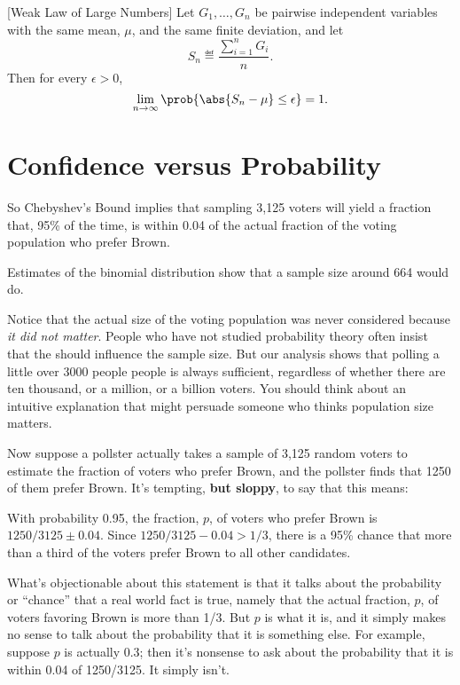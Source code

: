 \begin{corollary}\label{weaklaw}[Weak Law of Large Numbers]
  Let $G_1, \dots, G_n$ be pairwise independent variables with the same
  mean, $\mu$, and the same finite deviation, and let
\[
S_n \eqdef \frac{\sum_{i=1}^n G_i}{n}.
\]
Then for every $\epsilon > 0$,
\[
\lim_{n \rightarrow \infty}
        \prob{\abs{S_n - \mu}  \leq \epsilon} = 1.
\]
\end{corollary}

\section{Confidence versus Probability}\label{sec: Confidence_v_Prob}

So Chebyshev's Bound implies that sampling 3,125 voters will yield a
fraction that, 95\% of the time, is within 0.04 of the actual fraction
of the voting population who prefer Brown.  \begin{editingnotes}
  Estimates of the binomial distribution show that a sample size
  around 664 would do.
\end{editingnotes}

Notice that the actual size of the voting population was never
considered because \emph{it did not matter}.  People who have not
studied probability theory often insist that the 
should influence the sample size.  But our analysis shows that polling
a little over 3000 people people is always sufficient, regardless of
whether there are ten thousand, or a million, or a billion voters.
You should think about an intuitive explanation that might persuade
someone who thinks population size matters.

Now suppose a pollster actually takes a sample of 3,125 random voters to
estimate the fraction of voters who prefer Brown, and the pollster finds
that 1250 of them prefer Brown.  It's tempting, \textbf{but sloppy}, to
say that this means:
\begin{falseclm*}
  With probability 0.95, the fraction, $p$, of voters who prefer Brown
  is $1250/3125 \pm 0.04$.  Since $1250/3125 -0.04 > 1/3$, there is a 95\%
  chance that more than a third of the voters prefer Brown to all other
  candidates.
\end{falseclm*}
What's objectionable about this statement is that it talks about the
probability or ``chance'' that a real world fact is true, namely that
the actual fraction, $p$, of voters favoring Brown is more than 1/3.
But $p$ is what it is, and it simply makes no sense to talk about the
probability that it is something else.  For example, suppose $p$ is
actually 0.3; then it's nonsense to ask about the probability that it
is within 0.04 of 1250/3125.  It simply isn't.

